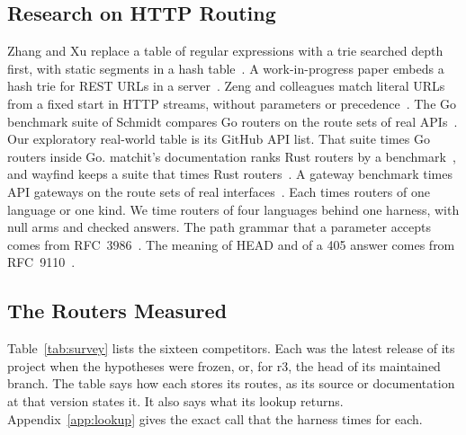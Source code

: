 \subsection{Research on HTTP Routing}

Zhang and Xu replace a table of regular expressions with a trie searched depth first, with
static segments in a hash table~\cite{zhang2015urlrouting}. A work-in-progress paper embeds a hash
trie for REST URLs in a server~\cite{dsouza2018htu}. Zeng and colleagues match literal URLs from a
fixed start in HTTP streams, without parameters or precedence~\cite{zeng2017mh}. The Go benchmark
suite of Schmidt compares Go routers on the route sets of real APIs~\cite{schmidt2020gohttproutingbench}.
Our exploratory real-world table is its GitHub API list. That suite times Go routers inside Go.
matchit's documentation ranks Rust routers by a benchmark~\cite{ahmed2026matchit}, and wayfind keeps
a suite that times Rust routers~\cite{sworn2026wayfind}. A gateway benchmark times API gateways on the
route sets of real interfaces~\cite{vm0012024gateways}. Each times routers of one language or one
kind. We time routers of four languages behind one harness, with null arms and checked answers. The path
grammar that a parameter accepts comes from RFC~3986~\cite{bernerslee2005rfc3986}. The meaning of
HEAD and of a 405 answer comes from RFC~9110~\cite{fielding2022rfc9110}.

\subsection{The Routers Measured}\label{sec:survey}

Table~\ref{tab:survey} lists the sixteen competitors. Each was the latest release of its project
when the hypotheses were frozen, or, for r3, the head of its maintained branch. The table says how
each stores its routes, as its source or documentation at that version states it. It also says what
its lookup returns. Appendix~\ref{app:lookup} gives the exact call that the harness times for each.


